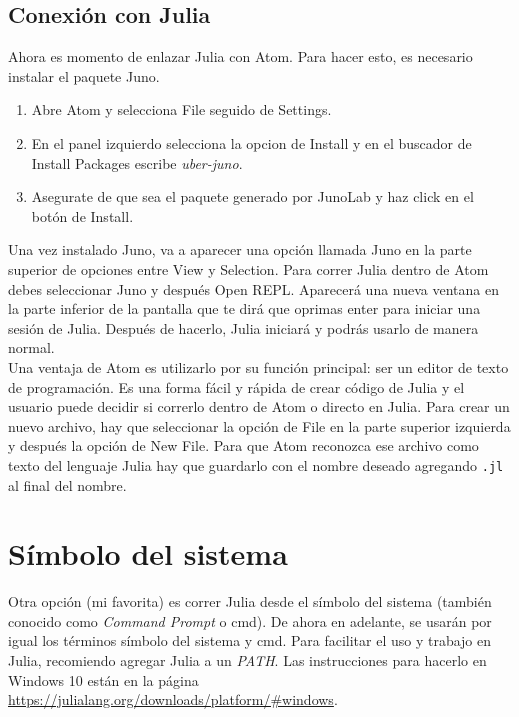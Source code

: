 \subsection{Conexión con Julia}
Ahora es momento de enlazar Julia con Atom. Para hacer esto, es necesario instalar el paquete Juno. 

\begin{enumerate}
    \item Abre Atom y selecciona \textsf{File} seguido de \textsf{Settings}. 
    \item En el panel izquierdo selecciona la opcion de \textsf{Install} y en el buscador de \textsf{Install Packages} escribe \textit{uber-juno}.
    \item Asegurate de que sea el paquete generado por JunoLab y haz click en el botón de \textsf{Install}. 
\end{enumerate}

Una vez instalado Juno, va a aparecer una opción llamada \textsf{Juno} en la parte superior de opciones entre \textsf{View} y \textsf{Selection}. Para correr Julia dentro de Atom debes seleccionar \textsf{Juno} y después \textsf{Open REPL}. Aparecerá una nueva ventana en la parte inferior de la pantalla que te dirá que oprimas enter para iniciar una sesión de Julia. Después de hacerlo, Julia iniciará y podrás usarlo de manera normal. 
\\
Una ventaja de Atom es utilizarlo por su función principal: ser un editor de texto de programación. Es una forma fácil y rápida de crear código de Julia y el usuario puede decidir si correrlo dentro de Atom o directo en Julia. Para crear un nuevo archivo, hay que seleccionar la opción de \textsf{File} en la parte superior izquierda y después la opción de \textsf{New File}. Para que Atom reconozca ese archivo como texto del lenguaje Julia hay que guardarlo con el nombre deseado agregando \texttt{.jl} al final del nombre. 



\section{Símbolo del sistema}
Otra opción (mi favorita) es correr Julia desde el símbolo del sistema (también conocido como \textit{Command Prompt} o cmd). De ahora en adelante, se usarán por igual los términos símbolo del sistema y cmd. Para facilitar el uso y trabajo en Julia, recomiendo agregar Julia a un \textit{PATH}. Las instrucciones para hacerlo en Windows 10 están en la página \url{https://julialang.org/downloads/platform/#windows}.

